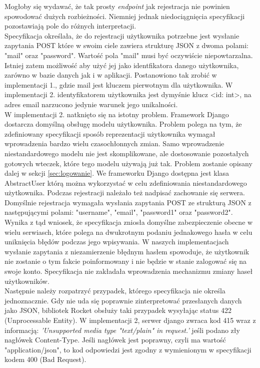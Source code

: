 \documentclass[12pt, notitlepage]{article}
\begin{document}
Mogłoby się wydawać, że tak prosty \textsl{endpoint} jak rejestracja nie powinien spowodować dużych rozbieżności. Niemniej jednak niedociągnięcia specyfikacji pozostawiają pole do różnych interpretacji.\\
Specyfikacja określała, że do rejestracji użytkownika potrzebne jest wysłanie zapytania POST które w swoim ciele zawiera strukturę JSON z dwoma polami: "mail" oraz "password". Wartość pola "mail" musi być oczywiście niepowtarzalna. Istniej zatem możliwość aby użyć jej jako identfikatora danego użytkownika, zarówno w bazie danych jak i w aplikacji. Postanowiono tak zrobić w implementacji 1., gdzie mail jest kluczem pierwotnym dla użytkownika. W implementacji 2. identyfikatorem użytkownika jest dymyśnie klucz <id: int>, na adres email narzucono jedynie warunek jego unikalności. \\
W implementacji 2. natknięto się na istotny problem. Framework Django dostarcza domyślną obsługę modelu użytkownika. Problem polega na tym, że zdefiniowany specyfikacji sposób reprezentacji użytkownika wymagał wprowadzenia bardzo wielu czasochłonnych zmian. Samo wprowadzenie niestandardowego modelu nie jest skomplikowane, ale dostosowanie pozostałych gotowych wteczek, które tego modelu używają już tak. Problem zostanie opisany dalej w sekcji \ref{sec:logowanie}. We frameworku Django dostępna jest klasa AbstractUser którą można wykorzystać w celu zdefiniowania niestandardowego użytkownika. Podczas rejestracji należało też nadpisać zachowanie się serwera. Domyślnie rejestracja wymagała wysłania zapytania POST ze strukturą JSON z następującymi polami: "username", "email", "password1" oraz "password2". Wynika z tąd wniosek, że specyfikacja zniosła domyślne zabezpieczenie obecne w wielu serwiasch, które polega na dwukrotnym podaniu jednakowego hasła w celu uniknięcia błędów podczas jego wpisywania. W naszych implementacjach wysłanie zapytania z niezamierzenie błędnym hasłem spowoduje, że użytkownik nie zostanie o tym fakcie poinformowany i nie będzie w stanie zalogować się na swoje konto. Specyfikacja nie zakładała wprowadzenia mechanizmu zmiany haseł użytkowników. \\
Następnie należy rozpatrzyć przypadek, którego specyfikacja nie określa jednoznacznie. Gdy nie uda się poprawnie zinterpretować przesłanych danych jako JSON, bibliotek Rocket obsłuży taki przypadek wysyłając status 422 (Unprocessable Entity). W implementacji 2, serwer django zwraca kod 415 wraz z informacją: \textit{'Unsupported media type "text/plain" in request.'} jeśli podano zły nagłówek Content-Type. Jeśli nagłówek jest poprawny, czyli ma wartość "application/json", to kod odpowiedzi jest zgodny z wymienionym w specyfikacji kodem 400 (Bad Request).  \\
\end{document}
